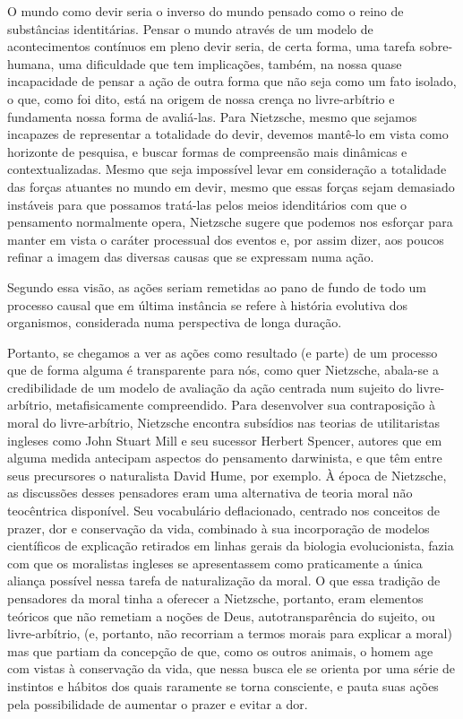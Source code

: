 \documentclass[
	12pt,				%
	openright,			%
	oneside,			%
	a4paper,			%
	english,			%
	french,				%
	spanish,			%
	brazil				%
	]{abntex2}
\begin{document}
O mundo como devir seria o inverso do mundo pensado como o reino de substâncias identitárias. Pensar o mundo através de um modelo de acontecimentos contínuos em pleno devir seria, de certa forma, uma tarefa sobre-humana, uma dificuldade que tem implicações, também, na nossa quase incapacidade de pensar a ação de outra forma que não seja como um fato isolado, o que, como foi dito, está na origem de nossa crença no livre-arbítrio e fundamenta nossa forma de avaliá-las. Para Nietzsche, mesmo que sejamos incapazes de representar a totalidade do devir, devemos mantê-lo em vista como horizonte de pesquisa, e buscar formas de compreensão mais dinâmicas e contextualizadas. Mesmo que seja impossível levar em consideração a totalidade das forças atuantes no mundo em devir, mesmo que essas forças sejam demasiado instáveis para que possamos tratá-las pelos meios idenditários com que o pensamento normalmente opera, Nietzsche sugere que podemos nos esforçar para manter em vista o caráter processual dos eventos e, por assim dizer, aos poucos refinar a imagem das diversas causas que se expressam numa ação.

	Segundo essa visão, as ações seriam remetidas ao pano de fundo de todo um processo causal que em última instância se refere à história evolutiva dos organismos, considerada numa perspectiva de longa duração. 
	
	Portanto, se chegamos a ver as ações como resultado (e parte) de um processo que de forma alguma é transparente para nós, como quer Nietzsche, abala-se a credibilidade de um modelo de avaliação da ação centrada num sujeito do livre-arbítrio, metafisicamente compreendido. Para desenvolver sua contraposição à moral do livre-arbítrio, Nietzsche encontra subsídios nas teorias de utilitaristas ingleses como John Stuart Mill e seu sucessor Herbert Spencer, autores que em alguma medida antecipam aspectos do pensamento darwinista, e que têm entre seus precursores o naturalista David Hume, por exemplo. À época de Nietzsche, as discussões desses pensadores eram uma alternativa de teoria moral não teocêntrica disponível. Seu vocabulário deflacionado, centrado nos conceitos de prazer, dor e conservação da vida, combinado à sua incorporação de modelos científicos de explicação retirados em linhas gerais da biologia evolucionista, fazia com que os moralistas ingleses se apresentassem como praticamente a única aliança possível nessa tarefa de naturalização da moral. O que essa tradição de pensadores da moral tinha a oferecer a Nietzsche, portanto, eram elementos teóricos que não remetiam a noções de Deus, autotransparência do sujeito, ou livre-arbítrio, (e, portanto, não recorriam a termos morais para explicar a moral) mas que partiam da concepção de que, como os outros animais, o homem age com vistas à conservação da vida, que nessa busca ele se orienta por uma série de instintos e hábitos dos quais raramente se torna consciente, e pauta suas ações pela possibilidade de aumentar o prazer e evitar a dor.
	
\end{document}
